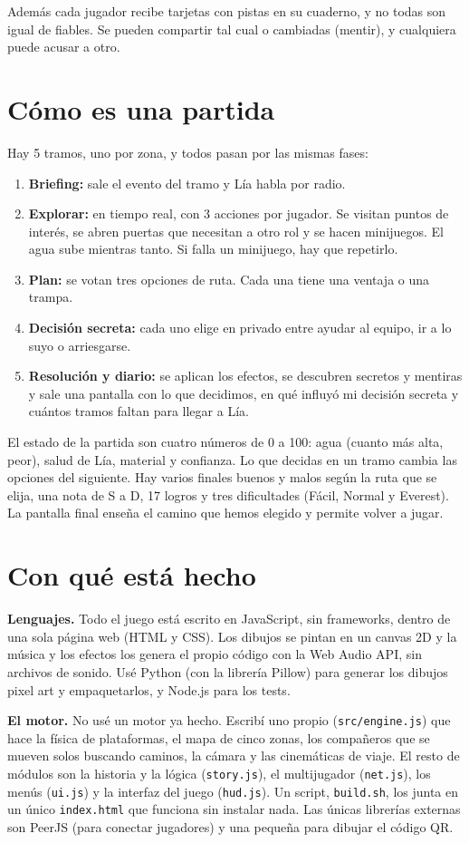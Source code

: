 \documentclass[11pt,a4paper]{article}
\begin{document}
Además cada jugador recibe tarjetas con pistas en su cuaderno, y no todas son igual de fiables. Se pueden compartir tal cual o cambiadas (mentir), y cualquiera puede acusar a otro.

\section{Cómo es una partida}
Hay 5 tramos, uno por zona, y todos pasan por las mismas fases:
\begin{enumerate}
\item \textbf{Briefing:} sale el evento del tramo y Lía habla por radio.
\item \textbf{Explorar:} en tiempo real, con 3 acciones por jugador. Se visitan puntos de interés, se abren puertas que necesitan a otro rol y se hacen minijuegos. El agua sube mientras tanto. Si falla un minijuego, hay que repetirlo.
\item \textbf{Plan:} se votan tres opciones de ruta. Cada una tiene una ventaja o una trampa.
\item \textbf{Decisión secreta:} cada uno elige en privado entre ayudar al equipo, ir a lo suyo o arriesgarse.
\item \textbf{Resolución y diario:} se aplican los efectos, se descubren secretos y mentiras y sale una pantalla con lo que decidimos, en qué influyó mi decisión secreta y cuántos tramos faltan para llegar a Lía.
\end{enumerate}
El estado de la partida son cuatro números de 0 a 100: agua (cuanto más alta, peor), salud de Lía, material y confianza. Lo que decidas en un tramo cambia las opciones del siguiente. Hay varios finales buenos y malos según la ruta que se elija, una nota de S a D, 17 logros y tres dificultades (Fácil, Normal y Everest). La pantalla final enseña el camino que hemos elegido y permite volver a jugar.

\section{Con qué está hecho}
\textbf{Lenguajes.} Todo el juego está escrito en JavaScript, sin frameworks, dentro de una sola página web (HTML y CSS). Los dibujos se pintan en un canvas 2D y la música y los efectos los genera el propio código con la Web Audio API, sin archivos de sonido. Usé Python (con la librería Pillow) para generar los dibujos pixel art y empaquetarlos, y Node.js para los tests.

\textbf{El motor.} No usé un motor ya hecho. Escribí uno propio (\texttt{src/engine.js}) que hace la física de plataformas, el mapa de cinco zonas, los compañeros que se mueven solos buscando caminos, la cámara y las cinemáticas de viaje. El resto de módulos son la historia y la lógica (\texttt{story.js}), el multijugador (\texttt{net.js}), los menús (\texttt{ui.js}) y la interfaz del juego (\texttt{hud.js}). Un script, \texttt{build.sh}, los junta en un único \texttt{index.html} que funciona sin instalar nada. Las únicas librerías externas son PeerJS (para conectar jugadores) y una pequeña para dibujar el código QR.
\end{document}
